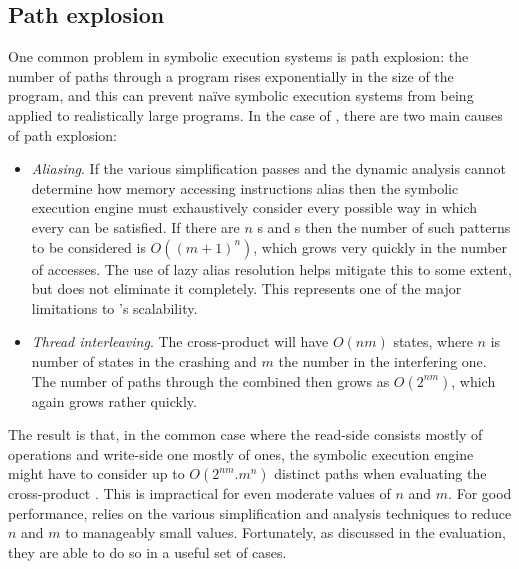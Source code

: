 
\subsection{Path explosion}

One common problem in symbolic execution systems is path explosion:
the number of paths through a program rises exponentially in the size
of the program, and this can prevent na\"ive symbolic execution
systems from being applied to realistically large programs.  In the
case of \technique, there are two main causes of path explosion:
\begin{itemize}
\item
  \textit{Aliasing}.  If the various simplification passes and the
  dynamic analysis cannot determine how memory accessing instructions
  alias then the symbolic execution engine must exhaustively consider
  every possible way in which every  can be satisfied.  If
  there are $n$ s and s then the number of
  such patterns to be considered is $O((m+1)^n)$, which grows very
  quickly in the number of accesses.  The use of lazy alias resolution
  helps mitigate this to some extent, but does not eliminate it
  completely.  This represents one of the major limitations to
  \technique's scalability.
\item
  \textit{Thread interleaving}.  The cross-product {\StateMachine}
  will have $O(nm)$ states, where $n$ is number of states in the
  crashing {\StateMachine} and $m$ the number in the interfering one.
  The number of paths through the combined {\StateMachine} then grows
  as $O(2^{nm})$, which again grows rather quickly.
\end{itemize}
The result is that, in the common case where the read-side
{\StateMachine} consists mostly of  operations and
write-side one mostly of  ones, the symbolic execution
engine might have to consider up to $O(2^{nm}.m^n)$ distinct
paths  when evaluating
the cross-product {\StateMachine}.  This is impractical for even
moderate values of $n$ and $m$.  For good performance, {\technique}
relies on the various simplification and analysis techniques to reduce
$n$ and $m$ to manageably small values.  Fortunately, as discussed in
the evaluation, they are able to do so in a useful set of cases.


